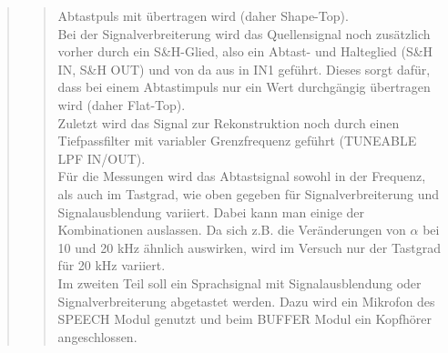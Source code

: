 \begin{quote}
\begin{quote}
     Abtastpuls mit übertragen wird (daher Shape-Top).\\
     Bei der Signalverbreiterung wird das Quellensignal noch zusätzlich vorher durch ein S\&H-Glied, also ein Abtast-
     und Halteglied (S\&H IN, S\&H OUT) und von da aus in IN1 geführt. Dieses sorgt dafür, dass bei einem Abtastimpuls
     nur ein Wert durchgängig übertragen wird (daher Flat-Top).\\
     \noindent\hspace*{4mm}
     Zuletzt wird das Signal zur Rekonstruktion noch durch einen Tiefpassfilter mit variabler Grenzfrequenz geführt
     (TUNEABLE LPF IN/OUT).\\
     \noindent\hspace*{4mm}
     Für die Messungen wird das Abtastsignal sowohl in der Frequenz, als auch im Tastgrad, wie oben gegeben für
     Signalverbreiterung und Signalausblendung variiert.
     Dabei kann man einige der Kombinationen auslassen. Da sich z.B. die Veränderungen von $\alpha$ bei 10 und 20 kHz
     ähnlich auswirken, wird im Versuch nur der Tastgrad für 20 kHz variiert.\\
     \noindent\hspace*{4mm}
     Im zweiten Teil soll ein Sprachsignal mit Signalausblendung oder Signalverbreiterung abgetastet werden. Dazu wird
     ein Mikrofon des SPEECH Modul genutzt und beim BUFFER Modul ein Kopfhörer angeschlossen.
    \end{quote}
    
\end{quote}


